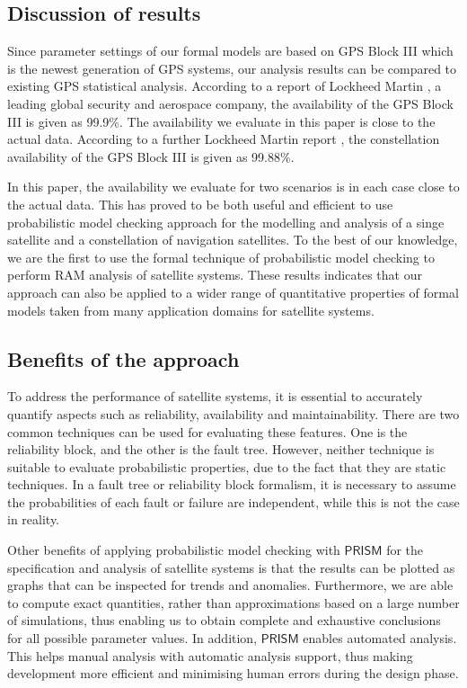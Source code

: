 \documentclass[preprint,12pt]{qrei}
\begin{document}
\subsection{Discussion of results}

Since parameter settings of our formal models are based on GPS Block III which is the newest generation of GPS systems, our analysis results can be compared to existing GPS statistical analysis. According to a report of Lockheed Martin \cite{Jac13}, a leading global security and aerospace company, the availability of the GPS Block III is given as 99.9\%. The availability we evaluate in this paper is close to the actual data. According to a further Lockheed Martin report \cite{Sha11}, the constellation availability of the GPS Block III is given as 99.88\%.

In this paper, the availability we evaluate for two scenarios is in each case close to the actual data. This has proved to be both useful and efficient to use probabilistic model checking approach for the modelling and analysis of a singe satellite and a constellation of navigation satellites. To the best of our knowledge, we are the first to use the formal technique of probabilistic model checking to perform RAM analysis of satellite systems. These results indicates that our approach can also be applied to a wider range of quantitative properties of formal models taken from many application domains for satellite systems.

\subsection{Benefits of the approach}

To address the performance of satellite systems, it is essential to accurately quantify aspects such as reliability, availability and maintainability. There are two common techniques can be used for evaluating these features. One is the reliability block, and the other is the fault tree. However, neither technique is suitable to evaluate probabilistic properties, due to the fact that they are static techniques. In a fault tree or reliability block formalism, it is necessary to assume the probabilities of each fault or failure are independent, while this is not the case in reality.



Other benefits of applying probabilistic model checking with $\mathsf{PRISM}$ for the specification and analysis of satellite systems is that the results can be plotted as graphs that can be inspected for trends and anomalies. Furthermore, we are able to compute exact quantities, rather than approximations based on a large number of simulations, thus enabling us to obtain complete and exhaustive conclusions for all possible parameter values. In addition, $\mathsf{PRISM}$ enables automated analysis. This helps manual analysis with automatic analysis support, thus making development more efficient and minimising human errors during the design phase.
\end{document}
